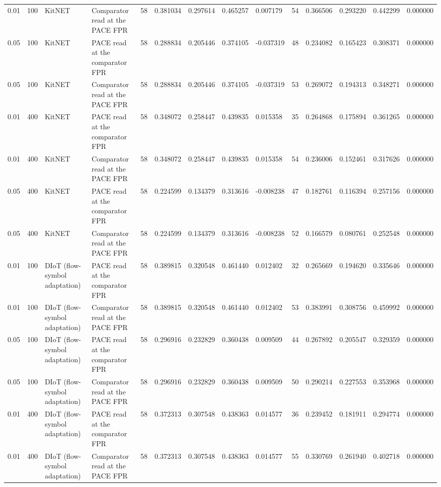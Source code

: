 \begin{tabular}{llllllllllllll}
0.01 & 100 & KitNET & Comparator read at the PACE FPR & 58 & 0.381034 & 0.297614 & 0.465257 & 0.007179 & 54 & 0.366506 & 0.293220 & 0.442299 & 0.000000 \\
0.05 & 100 & KitNET & PACE read at the comparator FPR & 58 & 0.288834 & 0.205446 & 0.374105 & -0.037319 & 48 & 0.234082 & 0.165423 & 0.308371 & 0.000000 \\
0.05 & 100 & KitNET & Comparator read at the PACE FPR & 58 & 0.288834 & 0.205446 & 0.374105 & -0.037319 & 53 & 0.269072 & 0.194313 & 0.348271 & 0.000000 \\
0.01 & 400 & KitNET & PACE read at the comparator FPR & 58 & 0.348072 & 0.258447 & 0.439835 & 0.015358 & 35 & 0.264868 & 0.175894 & 0.361265 & 0.000000 \\
0.01 & 400 & KitNET & Comparator read at the PACE FPR & 58 & 0.348072 & 0.258447 & 0.439835 & 0.015358 & 54 & 0.236006 & 0.152461 & 0.317626 & 0.000000 \\
0.05 & 400 & KitNET & PACE read at the comparator FPR & 58 & 0.224599 & 0.134379 & 0.313616 & -0.008238 & 47 & 0.182761 & 0.116394 & 0.257156 & 0.000000 \\
0.05 & 400 & KitNET & Comparator read at the PACE FPR & 58 & 0.224599 & 0.134379 & 0.313616 & -0.008238 & 52 & 0.166579 & 0.080761 & 0.252548 & 0.000000 \\
0.01 & 100 & DIoT (flow-symbol adaptation) & PACE read at the comparator FPR & 58 & 0.389815 & 0.320548 & 0.461440 & 0.012402 & 32 & 0.265669 & 0.194620 & 0.335646 & 0.000000 \\
0.01 & 100 & DIoT (flow-symbol adaptation) & Comparator read at the PACE FPR & 58 & 0.389815 & 0.320548 & 0.461440 & 0.012402 & 53 & 0.383991 & 0.308756 & 0.459992 & 0.000000 \\
0.05 & 100 & DIoT (flow-symbol adaptation) & PACE read at the comparator FPR & 58 & 0.296916 & 0.232829 & 0.360438 & 0.009509 & 44 & 0.267892 & 0.205547 & 0.329359 & 0.000000 \\
0.05 & 100 & DIoT (flow-symbol adaptation) & Comparator read at the PACE FPR & 58 & 0.296916 & 0.232829 & 0.360438 & 0.009509 & 50 & 0.290214 & 0.227553 & 0.353968 & 0.000000 \\
0.01 & 400 & DIoT (flow-symbol adaptation) & PACE read at the comparator FPR & 58 & 0.372313 & 0.307548 & 0.438363 & 0.014577 & 36 & 0.239452 & 0.181911 & 0.294774 & 0.000000 \\
0.01 & 400 & DIoT (flow-symbol adaptation) & Comparator read at the PACE FPR & 58 & 0.372313 & 0.307548 & 0.438363 & 0.014577 & 55 & 0.330769 & 0.261940 & 0.402718 & 0.000000 \\

\end{tabular}
